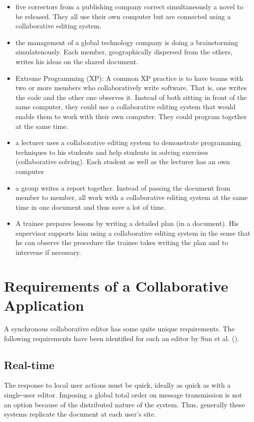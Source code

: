 \begin{itemize}
\item five correctors from a publishing company correct simultaneously a novel to be released. They all use their own computer but are connected using a collaborative editing system.
\item the management of a global technology company is doing a brainstorming simulatenously. Each member, geographically dispersed from the others, writes his ideas on the shared document.
\item Extreme Programming (XP): A common XP practice is to have teams with two or more members who collaboratively write software. That is, one writes the code and the other one observes it. Instead of both sitting in front of the same computer, they could use a collaborative editing system that would enable them to work with their own computer. They could program together at the same time.
\item a lecturer uses a collaborative editing system to demonstrate programming techniques to his students and help students in solving exercises (collaborative solving). Each student as well as the lecturer has an own computer
\item a group writes a report together. Instead of passing the document from member to member, all work with a collaborative editing system at the same time in one document and thus save a lot of time.
\item A trainee prepares lessons by writing a detailed plan (in a document). His supervisor supports him using a collaborative editing system in the sense that he can observe the procedure the trainee takes writing the plan and to intervene if necessary.
\end{itemize}



\section{Requirements of a Collaborative Application}
A synchronous collaborative editor has some quite unique requirements.
The following requirements have been identified for such an editor
by Sun et al. (\cite{sun98a}).

\subsection{Real-time} 
The response to local user actions must be quick, ideally
as quick as with a single-user editor. Imposing a global total order on
message transmission is not
an option because of the distributed nature of the system. Thus, generally 
these systems replicate the document at each user's site.

